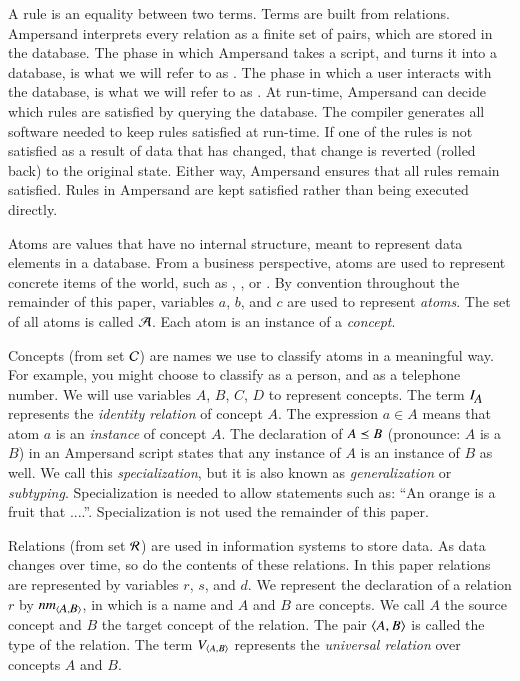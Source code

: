 \documentclass{elsarticle}
\begin{document}
	A rule is an equality between two terms.
	Terms are built from relations.
	Ampersand interprets every relation as a finite set of pairs, which are stored in the database.
	The phase in which Ampersand takes a script, and turns it into a database, is what we will refer to as .
	The phase in which a user interacts with the database, is what we will refer to as .
	At run-time, Ampersand can decide which rules are satisfied by querying the database.
	The compiler generates all software needed to keep rules satisfied at run-time.
	If one of the rules is not satisfied as a result of data that has changed,
	that change is reverted (rolled back) to the original state.
	Either way, Ampersand ensures that all rules remain satisfied.
	Rules in Ampersand are kept satisfied rather than being executed directly.
	
	Atoms are values that have no internal structure, meant to represent data elements in a database.
	From a business perspective, atoms are used to represent concrete items of the world,
	such as , , or .
	By convention throughout the remainder of this paper, variables $a$, $b$, and $c$ are used to represent \emph{atoms}.
	The set of all atoms is called $\mathcal{A}$.
        Each atom is an instance of a \emph{concept}.

	Concepts (from set $\mathcal{C}$) are names we use to classify atoms in a meaningful way.
	For example, you might choose to classify  as a person, and  as a telephone number.
        We will use variables $A$, $B$, $C$, $D$ to represent concepts.
	The term $I_{\text{\em \small A\/}}$ represents the \emph{identity relation} of concept $A$.
	The expression $a \in A$ means that atom $a$ is an \emph{instance} of concept $A$.
	The declaration of $A\preceq B$ (pronounce: $A$ is a $B$)
	in an Ampersand script states that any instance of $A$ is an instance of $B$ as well.
	We call this {\em specialization}, but it is also known as {\em generalization} or {\em subtyping}.
	Specialization is needed to allow statements such as: ``An orange is a fruit that ....''.
	Specialization is not used the remainder of this paper.

	Relations (from set $\mathcal{R}$) are used in information systems to store data.
	As data changes over time, so do the contents of these relations.
	In this paper relations are represented by variables $r$, $s$, and $d$.
	We represent the declaration of a relation $r$ by $\text{\em nm\/}_{\langle{\text{\em \small A\/}},{\text{\em \small B\/}}\rangle}$,
	in which  is a name and $A$ and $B$ are concepts.
	We call $A$ the source concept and $B$ the target concept of the relation.
	The pair $\langle{A},{B}\rangle$ is called the type of the relation.
	The term $V_{\langle{A},{B}\rangle}$ represents the \emph{universal relation} over concepts $A$ and $B$.
\end{document}
